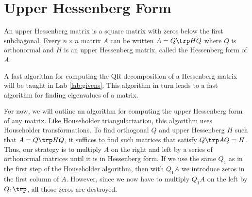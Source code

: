 \begin{comment}
Try the following to compute the condition number of $A$.
In this case the condition number of $A$ and $R$ are computed to be different, though, in theory, they should be exactly the same.
\begin{lstlisting}
>>> from numpy.linalg import cond
>>> cond(A)
4.1426075832870472e+18
>>> cond(R)
3.1767577244363792e+19
\end{lstlisting}

Householder QR factorization is more numerically stable than Gram-Schmidt or even Modified Gram-Schmidt (MGS).
However, MGS is still useful for some types of iterative methods because it finds the orthonormal basis one vector at a time instead of all at once (for an example see Lab \ref{lab:EigSolve}).
\end{comment}

\section*{Upper Hessenberg Form}
An upper Hessenberg matrix is a square matrix with zeros below the first subdiagonal.
Every  $n \times n$ matrix $A$ can be written $A = Q\trp HQ$ where $Q$ is orthonormal and $H$ is an upper Hessenberg matrix, called the Hessenberg form of $A$.

A fast algorithm for computing the QR decomposition of a Hessenberg matrix will be taught in Lab \ref{lab:givens}. This algorithm in turn leads to a fast algorithm for finding eigenvalues of a matrix.

For now, we will outline an algorithm for computing the upper Hessenberg form of any matrix. 
Like Householder triangularization, this algorithm uses Householder transformations.
To find orthogonal $Q$ and upper Hessenberg $H$ such that $A = Q\trp HQ$, it suffices to find such matrices that satisfy $Q\trp AQ=H$. 
Thus, our strategy is to multiply $A$ on the right and left by a series of orthonormal matrices until it is in Hessenberg form.
If we use the same $Q_1$ as in the first step of the Householder algorithm, then with $Q_1 A$ we introduce zeros in the first column of $A$.
However, since we now have to multiply $Q_1 A$ on the left by $Q_1\trp$, all those zeros are destroyed.

